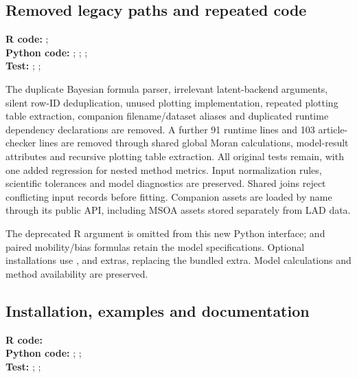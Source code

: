 \documentclass[10pt]{article}
\begin{document}
\subsection{Removed legacy paths and repeated code}
{\footnotesize \textbf{R code:} ; \\
\textbf{Python code:} ; ; ; \\
\textbf{Test:} ; ; \par}

The duplicate Bayesian formula parser, irrelevant latent-backend arguments, silent
row-ID deduplication, unused plotting implementation, repeated plotting table extraction,
companion filename/dataset aliases and duplicated runtime dependency declarations are removed.
A further 91 runtime lines and 103 article-checker lines are removed through shared global
Moran calculations, model-result attributes and recursive plotting table extraction. All original
tests remain, with one added regression for nested method metrics. Input normalization rules,
scientific tolerances and model diagnostics are preserved. Shared joins reject conflicting input records before fitting. Companion assets are loaded by
name through its public API, including MSOA assets stored separately from LAD data.

The deprecated R  argument is omitted from this new Python interface;
 and paired mobility/bias formulas retain the model specifications.
Optional installations use ,  and  extras,
replacing the bundled  extra. Model calculations and method availability are preserved.

\subsection{Installation, examples and documentation}
{\footnotesize \textbf{R code:} \\
\textbf{Python code:} ; ; \\
\textbf{Test:} ; ; \par}
\end{document}
